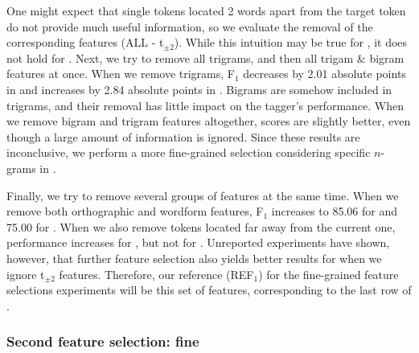 \documentclass[output=paper,modfonts]{langscibook}
\begin{document}
One might expect that single tokens located 2 words apart from the target token do not provide much useful information, so we evaluate the removal of the corresponding features ({\textsc ALL} - {t}$_{\pm 2}$). While this intuition may be true for \devAQ{}, it does not hold for \devDD{}. 
Next, we try to remove all trigrams, and then all trigam \& bigram features at once. When we remove trigrams, F$_1$ decreases by 2.01 absolute points in \devDD{} and increases by 2.84 absolute points in \devAQ{}.
Bigrams are somehow included in trigrams, and their removal has little impact on the tagger's performance. When we remove bigram and trigram features altogether, scores are slightly better, even though a large amount of information is ignored. Since these results are inconclusive, we perform a more fine-grained selection considering specific $n$-grams in . %
 
Finally, we try to remove several groups of features at the same time. When we remove both orthographic and wordform features, F$_1$ increases to 85.06 for \devAQ{} and 75.00 for \devDD{}. When we also remove tokens located far away from the current one, performance increases for \devDD{}, but not for \devAQ{}. Unreported experiments have shown, however, that further feature selection %
also yields better results for \devAQ{} when we ignore t$_{\pm 2}$ features. Therefore, our reference ({\textsc REF$_1$}) for the fine-grained feature selections experiments will be this set of features, corresponding to the last row of .


\subsubsection{Second feature selection: fine}
\label{subsec:results-ambig-feat-fine}
\end{document}
